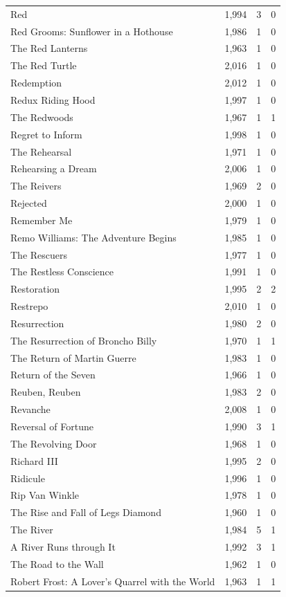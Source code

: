 \begin{tabular}{lrrr}
Red & 1,994 & 3 & 0 \\
Red Grooms: Sunflower in a Hothouse & 1,986 & 1 & 0 \\
The Red Lanterns & 1,963 & 1 & 0 \\
The Red Turtle & 2,016 & 1 & 0 \\
Redemption & 2,012 & 1 & 0 \\
Redux Riding Hood & 1,997 & 1 & 0 \\
The Redwoods & 1,967 & 1 & 1 \\
Regret to Inform & 1,998 & 1 & 0 \\
The Rehearsal & 1,971 & 1 & 0 \\
Rehearsing a Dream & 2,006 & 1 & 0 \\
The Reivers & 1,969 & 2 & 0 \\
Rejected & 2,000 & 1 & 0 \\
Remember Me & 1,979 & 1 & 0 \\
Remo Williams: The Adventure Begins & 1,985 & 1 & 0 \\
The Rescuers & 1,977 & 1 & 0 \\
The Restless Conscience & 1,991 & 1 & 0 \\
Restoration & 1,995 & 2 & 2 \\
Restrepo & 2,010 & 1 & 0 \\
Resurrection & 1,980 & 2 & 0 \\
The Resurrection of Broncho Billy & 1,970 & 1 & 1 \\
The Return of Martin Guerre & 1,983 & 1 & 0 \\
Return of the Seven & 1,966 & 1 & 0 \\
Reuben, Reuben & 1,983 & 2 & 0 \\
Revanche & 2,008 & 1 & 0 \\
Reversal of Fortune & 1,990 & 3 & 1 \\
The Revolving Door & 1,968 & 1 & 0 \\
Richard III & 1,995 & 2 & 0 \\
Ridicule & 1,996 & 1 & 0 \\
Rip Van Winkle & 1,978 & 1 & 0 \\
The Rise and Fall of Legs Diamond & 1,960 & 1 & 0 \\
The River & 1,984 & 5 & 1 \\
A River Runs through It & 1,992 & 3 & 1 \\
The Road to the Wall & 1,962 & 1 & 0 \\
Robert Frost: A Lover's Quarrel with the World & 1,963 & 1 & 1 \\

\end{tabular}

